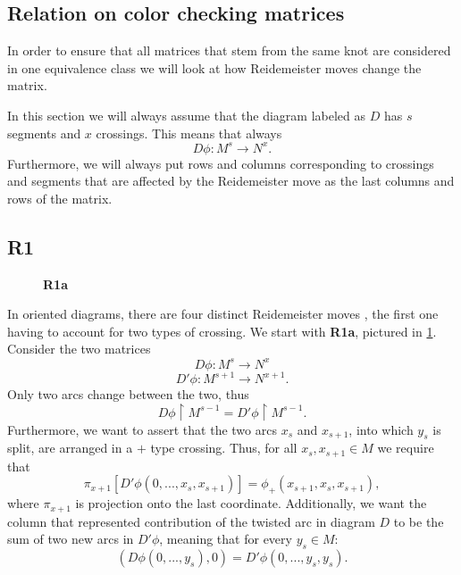 \subsection{Relation on color checking matrices}

In order to ensure that all matrices that stem from the same knot are considered in one equivalence class we will look at how Reidemeister moves change the matrix. 

In this section we will always assume that the diagram labeled as $D$ has $s$ segments and $x$ crossings. This means that always 
$$D\phi:M^s \to N^x.$$
Furthermore, we will always put rows and columns corresponding to crossings and segments that are affected by the Reidemeister move as the last columns and rows of the matrix.

\subsection*{\centering R1}

\def\bracketL{[}
\def\bracketR{]}
\renewcommand{\figurename}{}
\captionsetup{labelformat=empty}

\begin{figure}[h!]\centering 
  \caption{\textbf{R1a}\label{R1a}}
  \medskip

\end{figure}

In oriented diagrams, there are four distinct Reidemeister moves \cite{ruchy_zorientowane}, the first one having to account for two types of crossing. We start with \textbf{R1a}, pictured in \cref{R1a}. Consider the two matrices 
$$D\phi:M^s\to N^x$$ 
$$D'\phi:M^{s+1}\to N^{x+1}.$$
Only two arcs change between the two, thus 
$$D\phi\restriction M^{s-1}=D'\phi\restriction M^{s-1}.$$
Furthermore, we want to assert that the two arcs $x_s$ and $x_{s+1}$, into which $y_s$ is split, are arranged in a $+$ type crossing. Thus, for all $x_s, x_{s+1}\in M$ we require that
$$\pi_{x+1}[D'\phi(0,..., x_s, x_{s+1})]=\phi_+(x_{s+1},x_s,x_{s+1}),$$
where $\pi_{x+1}$ is projection onto the last coordinate. 
Additionally, we want the column that represented contribution of the twisted arc in diagram $D$ to be the sum of two new arcs in $D'\phi$, meaning that for every $y_s\in M$:
$$(D\phi(0,..., y_s), 0)=D'\phi(0,..., y_s, y_s).$$

